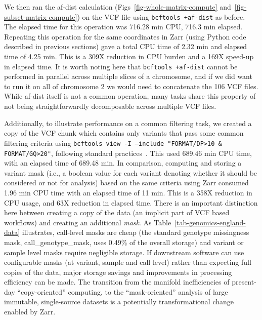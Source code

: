 \documentclass[a4paper,num-refs]{oup-contemporary}
\begin{document}
We then ran the af-dist calculation (Figs~\ref{fig-whole-matrix-compute}
and~\ref{fig-subset-matrix-compute}) on the VCF file
using \texttt{bcftools +af-dist} as before. 
The elapsed time for this operation was 716.28 min CPU, 716.3 min elapsed.
Repeating this operation for the same coordinates in Zarr 
(using Python code described in previous sections) 
gave a total CPU time of 2.32 min and elapsed time of 4.25 min.
This is a 309X reduction in CPU burden and a 169X speed-up in elapsed time.
It is worth noting here that \texttt{bcftools +af-dist} cannot be 
performed in parallel across multiple slices of a chromosome, and if 
we did want to run it on all of chromosome 2 we would need to 
concatenate the 106 VCF files. While af-dist itself is not a common operation,
many tasks share this property
of not being straightforwardly decomposable across multiple VCF files.

Additionally, to illustrate performance on a common filtering task, we 
created a copy of the VCF chunk which contains only variants 
that pass some common filtering criteria using
\texttt{bcftools view -I --include "FORMAT/DP>10 \& FORMAT/GQ>20"},
following standard practices~\citep[e.g.][]{bergstrom2020insights,
kousathanas2022whole,
chen2024genomic}.
This used 689.46 min CPU time, with an elapsed time of 689.48 min.
In comparison, computing and storing a variant mask (i.e., a boolean value 
for each variant denoting whether it should be considered or not
for analysis) based on the same criteria using Zarr 
consumed 1.96 min CPU time with an elapsed time of 11 min.
This is a 358X reduction in CPU usage, and 63X reduction in elapsed time.
There is an important distinction here between creating a copy
of the data (an implicit part of VCF based workflows) and creating an
additional \emph{mask}. As Table~\ref{tab-genomics-england-data} 
illustrates, call-level masks are cheap (the standard 
genotype missingness mask, call\_genotype\_mask, uses 0.49\% of the overall 
storage) and variant or sample level masks require negligible storage.
If downstream software can 
use configurable masks (at variant, sample and call level) 
rather than expecting full copies of the data, major storage savings
and improvements in processing efficiency can be made.
The transition from the manifold inefficiencies of 
present-day ``copy-oriented'' computing,
to the ``mask-oriented'' analysis of large immutable, single-source
datasets is a potentially transformational change enabled by Zarr.
\end{document}
